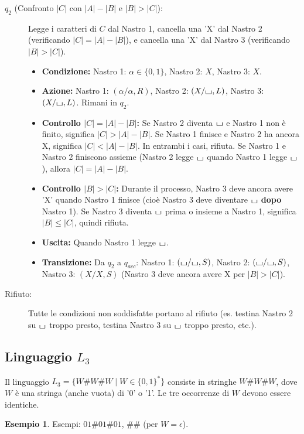 \documentclass[a4paper]{article}
\theoremstyle{definition} %
\newtheorem{example}{Esempio}
\newcommand{\blankS}{\ensuremath{\raisebox{-0.15ex}{\scalebox{1.3}[0.7]{$\sqcup$}}}}
\begin{document}
\begin{description}
    \item[$q_2$ (Confronto $|C|$ con $|A|-|B|$ e $|B|>|C|$):] Legge i caratteri di $C$ dal Nastro 1, cancella una 'X' dal Nastro 2 (verificando $|C|=|A|-|B|$), e cancella una 'X' dal Nastro 3 (verificando $|B|>|C|$).
    \begin{itemize}
        \item \textbf{Condizione:} Nastro 1: $\alpha \in \{0,1\}$, Nastro 2: $X$, Nastro 3: $X$.
        \item \textbf{Azione:} Nastro 1: $(\alpha/\alpha, R)$, Nastro 2: $(X/\blankS, L)$, Nastro 3: $(X/\blankS, L)$. Rimani in $q_2$.
        \item \textbf{Controllo $|C|=|A|-|B|$:} Se Nastro 2 diventa $\blankS$ e Nastro 1 non è finito, significa $|C|>|A|-|B|$. Se Nastro 1 finisce e Nastro 2 ha ancora X, significa $|C|<|A|-|B|$. In entrambi i casi, rifiuta. Se Nastro 1 e Nastro 2 finiscono assieme (Nastro 2 legge $\blankS$ quando Nastro 1 legge $\blankS$), allora $|C|=|A|-|B|$.
        \item \textbf{Controllo $|B|>|C|$:} Durante il processo, Nastro 3 deve ancora avere 'X' quando Nastro 1 finisce (cioè Nastro 3 deve diventare $\blankS$ \textbf{dopo} Nastro 1). Se Nastro 3 diventa $\blankS$ prima o insieme a Nastro 1, significa $|B| \le |C|$, quindi rifiuta.
        \item \textbf{Uscita:} Quando Nastro 1 legge $\blankS$.
        \item \textbf{Transizione:} Da $q_2$ a $q_{acc}$: Nastro 1: $(\blankS/\blankS, S)$, Nastro 2: $(\blankS/\blankS, S)$, Nastro 3: $(X/X, S)$ (Nastro 3 deve ancora avere X per $|B|>|C|$).
    \end{itemize}
    \item[Rifiuto:] Tutte le condizioni non soddisfatte portano al rifiuto (es. testina Nastro 2 su $\blankS$ troppo presto, testina Nastro 3 su $\blankS$ troppo presto, etc.).
\end{description}

\subsection{Linguaggio $L_3$}
Il linguaggio $L_3 = \{W\#W\#W \mid W \in \{0,1\}^*\}$ consiste in stringhe $W\#W\#W$, dove $W$ è una stringa (anche vuota) di '0' o '1'. Le tre occorrenze di $W$ devono essere identiche.
\begin{example}
Esempi: $01\#01\#01$, $\#\#$ (per $W=\epsilon$).
\end{example}
\end{document}
